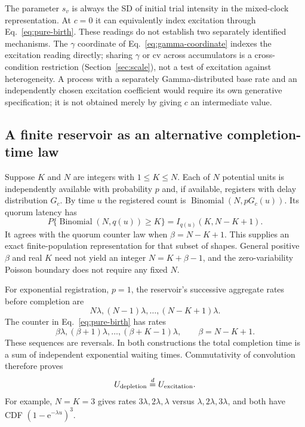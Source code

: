 \documentclass[12pt]{article}
\newcommand{\e}{\mathrm{e}}
\newcommand{\Binomial}{\operatorname{Binomial}}
\theoremstyle{definition}
\theoremstyle{plain}
\theoremstyle{remark}
\begin{document}
The parameter $s_v$ is always the SD of initial trial intensity in the mixed-clock representation. At $c=0$ it can equivalently index excitation through Eq.~\eqref{eq:pure-birth}. These readings do not establish two separately identified mechanisms. The $\gamma$ coordinate of Eq.~\eqref{eq:gamma-coordinate} indexes the excitation reading directly; sharing $\gamma$ or $\mathrm{cv}$ across accumulators is a cross-condition restriction (Section~\ref{sec:scale}), not a test of excitation against heterogeneity. A process with a separately Gamma-distributed base rate and an independently chosen excitation coefficient would require its own generative specification; it is not obtained merely by giving $c$ an intermediate value.

\subsection{A finite reservoir as an alternative completion-time law}\label{sec:reservoir}
Suppose $K$ and $N$ are integers with $1\leq K\leq N$. Each of $N$ potential units is independently available with probability $p$ and, if available, registers with delay distribution $G_c$. By time $u$ the registered count is $\Binomial(N,pG_c(u))$. Its quorum latency has
\begin{equation}
 P\{\Binomial(N,q(u))\geq K\}=I_{q(u)}(K,N-K+1).\label{eq:reservoir}
\end{equation}
It agrees with the quorum counter law when $\beta=N-K+1$. This supplies an exact finite-population representation for that subset of shapes. General positive $\beta$ and real $K$ need not yield an integer $N=K+\beta-1$, and the zero-variability Poisson boundary does not require any fixed $N$.

For exponential registration, $p=1$, the reservoir's successive aggregate rates before completion are
\begin{equation}
 N\lambda,(N-1)\lambda,\ldots,(N-K+1)\lambda.
\end{equation}
The counter in Eq.~\eqref{eq:pure-birth} has rates
\begin{equation}
 \beta\lambda,(\beta+1)\lambda,\ldots,(\beta+K-1)\lambda,
 \qquad \beta=N-K+1.
\end{equation}
These sequences are reversals. In both constructions the total completion time is a sum of independent exponential waiting times. Commutativity of convolution therefore proves
\begin{equation}
 U_{\rm depletion}\overset d=U_{\rm excitation}.\label{eq:reversal}
\end{equation}
For example, $N=K=3$ gives rates $3\lambda,2\lambda,\lambda$ versus $\lambda,2\lambda,3\lambda$, and both have CDF $(1-\e^{-\lambda u})^3$.
\end{document}
